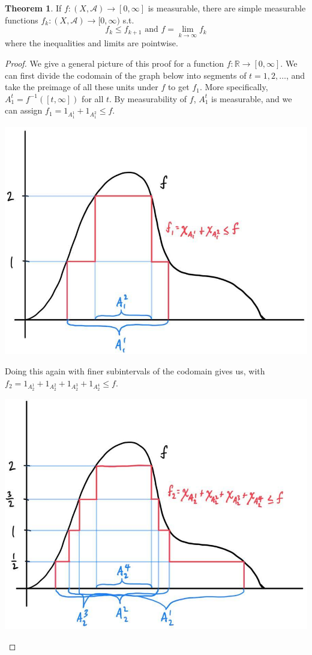 \documentclass{article}
\theoremstyle{definition}
\newtheorem{theorem}{Theorem}[section]
\theoremstyle{remark}
\theoremstyle{definition}
\begin{document}
\begin{theorem}
If $f: (X, \mathcal{A}) \longrightarrow [0, \infty]$ is measurable, there are simple measurable functions $f_k : (X, \mathcal{A}) \longrightarrow [0, \infty)$ s.t. 
\[f_k \leq f_{k+1} \text{ and } f = \lim_{k \rightarrow \infty} f_k\]
where the inequalities and limits are pointwise. 
\end{theorem}
\begin{proof}
We give a general picture of this proof for a function $f: \mathbb{R} \longrightarrow [0, \infty]$. We can first divide the codomain of the graph below into segments of $t = 1, 2, \ldots$, and take the preimage of all these units under $f$ to get $f_1$. More specifically, $A_1^t = f^{-1} ([t, \infty])$ for all $t$. By measurability of $f$, $A_1^t$ is measurable, and we can assign $f_1 = 1_{A^1_1} + 1_{A_1^2} \leq f$. 
\begin{center}
    \includegraphics[scale=0.23]{img/Lebesgue_1.jpg}
\end{center}
Doing this again with finer subintervals of the codomain gives us, with $f_2 = 1_{A_2^1} + 1_{A_2^2} + 1_{A_2^3} + 1_{A_2^4} \leq f$. 
\begin{center}
    \includegraphics[scale=0.23]{img/Lebesgue_2.jpg}

\end{center}
\end{proof}
\end{document}
